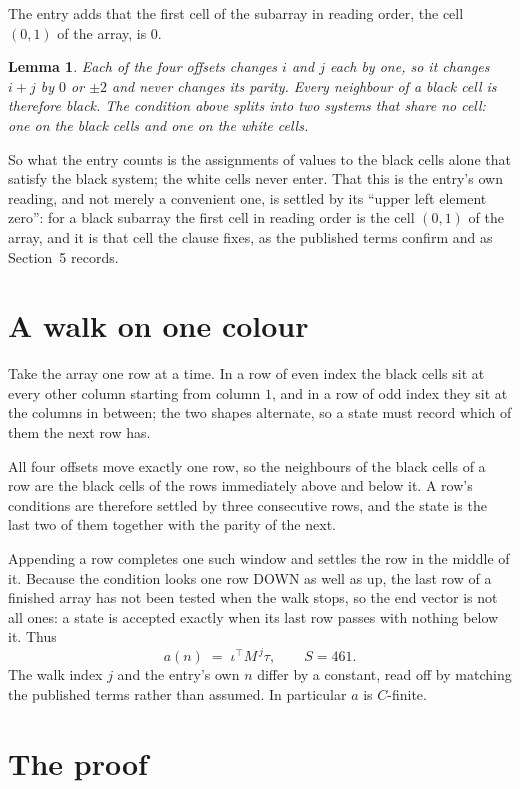 \documentclass[11pt,a4paper]{article}
\theoremstyle{plain}
\newtheorem{lemma}[theorem]{Lemma}
\theoremstyle{definition}
\begin{document}
The entry adds that the first cell of the subarray in reading order, the cell $(0,1)$ of the array, is $0$.

\begin{lemma}\label{lem:split}
Each of the four offsets changes $i$ and $j$ each by one, so it changes $i+j$ by $0$ or $\pm2$
and never changes its parity. Every neighbour of a black cell is therefore black. The condition
above splits into two systems that share no cell: one on the black cells and one on the white
cells.
\end{lemma}

So what the entry counts is the assignments of values to the black cells alone that satisfy the
black system; the white cells never enter. That this is the entry's own reading, and not
merely a convenient one, is settled by its ``upper left element zero'': for a black subarray the
first cell in reading order is the cell $(0,1)$ of the array, and it is that cell the
clause fixes, as the published terms confirm and as Section~5 records.

\section{A walk on one colour}

Take the array one row at a time. In a row of even index the black cells sit at every other
column starting from column $1$, and in a row of odd index they sit at the columns in
between; the two shapes alternate, so a state must record which of them the next row has.

All four offsets move exactly one row, so the neighbours of the black cells of a row are the
black cells of the rows immediately above and below it. A row's conditions are therefore settled
by three consecutive rows, and the state is the last two of them together with the parity of the
next.

Appending a row completes one such window and settles the row in the middle of it. Because the
condition looks one row DOWN as well as up, the last row of a finished array has not been tested
when the walk stops, so the end vector is not all ones: a state is accepted exactly when its
last row passes with nothing below it. Thus
\[
a(n)\;=\;\iota^{\!\top}M^{\,j}\tau ,\qquad S=461.
\]
The walk index $j$ and the entry's own $n$ differ by a constant, read off by matching the
published terms rather than assumed. In particular $a$ is $C$-finite.

\section{The proof}
\end{document}
